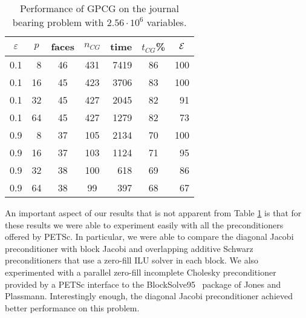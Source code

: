 \begin{table}[htb]
\begin{center}
\begin{tabular}{| c r | c c r c r |}
\hline
\multicolumn{1}{|c}{$ \varepsilon $} & 
\multicolumn{1}{c|}{$ p $} & 
\multicolumn{1}{c}{faces} &
\multicolumn{1}{c}{$n_{CG}$} & 
\multicolumn{1}{c}{time} &
\multicolumn{1}{c}{$t_{CG}$\%} & 
\multicolumn{1}{c|}{$ \cal E $} \\ \hline
0.1  & 8 & 46 & 431 & 7419 & 86 & 100  \\ 
0.1  & 16 & 45 & 423 & 3706 & 83 & 100  \\
0.1  & 32 & 45 & 427 & 2045 & 82 & 91 \\
0.1  & 64 & 45 & 427 & 1279 & 82 & 73 \\
\hline
0.9  & 8 & 37 & 105 & 2134 & 70 & 100 \\
0.9  & 16 & 37 & 103 & 1124 & 71 & 95 \\
0.9  & 32 & 38 & 100 & 618 & 69 & 86 \\
0.9  & 64 & 38 & 99 & 397 & 68 & 67 \\
\hline
\end{tabular}
\caption{Performance of GPCG on the journal bearing problem
with $ 2.56 \cdot 10^6 $ variables.}
\label{flops}
\end{center}
\end{table}




An important aspect of our results that is not
apparent from Table \ref{flops} is that 
for these results we were able to experiment easily 
with all the preconditioners offered by PETSc.
In particular, we were able to compare the diagonal Jacobi
preconditioner with block Jacobi and overlapping additive Schwarz
preconditioners that use a zero-fill ILU solver in each block.  We
also experimented with a parallel zero-fill incomplete Cholesky preconditioner
provided by a PETSc interface to the BlockSolve95~\cite{bs-user-ref}
package of Jones and
Plassmann.  Interestingly enough, the diagonal Jacobi preconditioner
achieved better performance on this problem.



